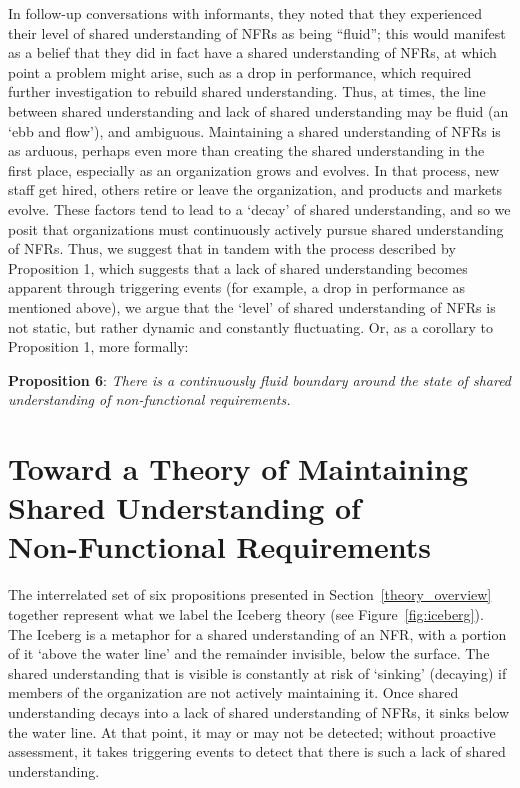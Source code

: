 \documentclass[smallextended]{svjour3}
\newcommand\cwproposition[2]{
\normalsize 
\vspace{0.5em}%
\noindent \textbf{\sffamily\fontsize{9}{11}\selectfont Proposition #1}: \textit{#2}
\vspace{0.5em}
}
\begin{document}
In follow-up conversations with informants, they noted that they experienced their level of shared understanding of NFRs as being ``fluid''; this would manifest as a belief that they did in fact have a shared understanding of NFRs, at which point a problem might arise, such as a drop in performance, which required further investigation to rebuild shared understanding.
Thus, at times, the line between shared understanding and lack of shared understanding may be fluid (an `ebb and flow'), and ambiguous. 
Maintaining a shared understanding of NFRs is as arduous, perhaps even more than creating the shared understanding in the first place, especially as an organization grows and evolves. In that process, new staff get hired, others retire or leave the organization, and products and markets evolve. 
These factors tend to lead to a `decay' of shared understanding, and so we posit that organizations must continuously actively pursue shared understanding of NFRs. Thus, we suggest that in tandem with the process described by Proposition 1, which suggests that a lack of shared understanding becomes apparent through triggering events (for example, a drop in performance as mentioned above), we argue that the `level' of shared understanding of NFRs is not static, but rather dynamic and constantly fluctuating. Or, as a corollary to Proposition 1, more formally:


\cwproposition{6}{There is a continuously fluid boundary around the state of shared understanding of non-functional requirements.}









\section{Toward a Theory of Maintaining Shared Understanding of\\ Non-Functional Requirements}
\label{sec:discussion}

The interrelated set of six propositions presented in Section~\ref{theory_overview} together represent what we label the Iceberg theory (see Figure~\ref{fig:iceberg}). 
The Iceberg is a metaphor \citep{stol2024theorizing} for a shared understanding of an NFR, with a portion of it `above the water line' and the remainder invisible, below the surface.
The shared understanding that is visible is constantly at risk of `sinking' (decaying) if members of the organization are not actively maintaining it. Once shared understanding decays into a lack of shared understanding of NFRs, it sinks below the water line. At that point, it may or may not be detected; without proactive assessment, it takes triggering events to detect that there is such a lack of shared understanding. 
\end{document}
